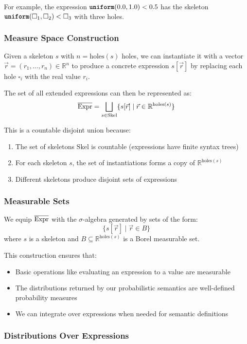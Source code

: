 For example, the expression $\text{\ttfamily\bfseries uniform}(0.0, 1.0) < 0.5$ has the skeleton $\text{\ttfamily\bfseries uniform}(\square_1, \square_2) < \square_3$ with three holes.

\subsubsection{Measure Space Construction}

Given a skeleton $s$ with $n = \text{holes}(s)$ holes, we can instantiate it with a vector $\vec{r} = (r_1, \ldots, r_n) \in \mathbb{R}^n$ to produce a concrete expression $s[\vec{r}]$ by replacing each hole $\square_i$ with the real value $r_i$.

The set of all extended expressions can then be represented as:
\[
{\overline{\text{Expr}}} = \bigsqcup_{s \in \text{Skel}} \{s[\vec{r}] \mid \vec{r} \in \mathbb{R}^{\text{holes}(s)}\}
\]

This is a countable disjoint union because:
\begin{enumerate}
    \item The set of skeletons $\text{Skel}$ is countable (expressions have finite syntax trees)
    \item For each skeleton $s$, the set of instantiations forms a copy of $\mathbb{R}^{\text{holes}(s)}$
    \item Different skeletons produce disjoint sets of expressions
\end{enumerate}

\subsubsection{Measurable Sets}

We equip ${\overline{\text{Expr}}}$ with the $\sigma$-algebra generated by sets of the form:
\[
\{s[\vec{r}] \mid \vec{r} \in B\}
\]
where $s$ is a skeleton and $B \subseteq \mathbb{R}^{\text{holes}(s)}$ is a Borel measurable set.

This construction ensures that:
\begin{itemize}
    \item Basic operations like evaluating an expression to a value are measurable
    \item The distributions returned by our probabilistic semantics are well-defined probability measures
    \item We can integrate over expressions when needed for semantic definitions
\end{itemize}

\subsubsection{Distributions Over Expressions}

